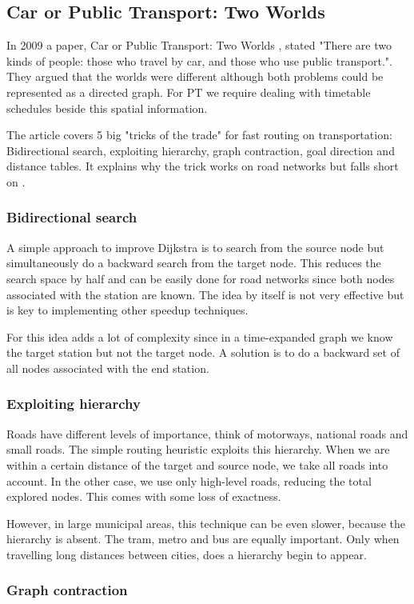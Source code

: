 \subsection{Car or Public Transport: Two Worlds}
In 2009 a paper, Car or Public Transport: Two Worlds \cite{bast_car_2009}, stated "There are two kinds of people: those who travel by car, and those who use public transport.". They argued that the worlds were different although both problems could be represented as a directed graph. For PT we require dealing with timetable schedules beside this spatial information.

The article covers 5 big "tricks of the trade" for fast routing on transportation: Bidirectional search, exploiting hierarchy, graph contraction, goal direction and distance tables. It explains why the trick works on road networks but falls short on .

\subsubsection{Bidirectional search}
A simple approach to improve Dijkstra is to search from the source node but simultaneously do a backward search from the target node. This reduces the search space by half and can be easily done for road networks since both nodes associated with the station are known. The idea by itself is not very effective but is key to implementing other speedup techniques.

For  this idea adds a lot of complexity since in a time-expanded graph we know the target station but not the target node. A solution is to do a backward set of all nodes associated with the end station.
\subsubsection{Exploiting hierarchy}
Roads have different levels of importance, think of motorways, national roads and small roads. The simple routing heuristic exploits this hierarchy. When we are within a certain distance of the target and source node, we take all roads into account. In the other case, we use only high-level roads, reducing the total explored nodes. This comes with some loss of exactness.

However, in large municipal areas, this technique can be even slower, because the hierarchy is absent. The tram, metro and bus are equally important. Only when travelling long distances between cities, does a hierarchy begin to appear. 
\subsubsection{Graph contraction}
